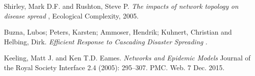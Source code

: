 \documentclass[11pt]{article}
\begin{document}
\newpage
\begin{thebibliography}{9}
 Shirley, Mark D.F. and Rushton, Steve P. \textit{ The impacts of network topology on disease spread }, Ecological Complexity, 2005.

 Buzna, Lubos; Peters, Karsten; Ammoser, Hendrik;  Kuhnert, Christian and Helbing, Dirk.\textit{ Efficient Response to Cascading Disaster Spreading } .

Keeling, Matt J. and Ken T.D. Eames. \textit{ Networks and Epidemic Models } Journal of the Royal Society Interface 2.4 (2005): 295–307. PMC. Web. 7 Dec. 2015.

\end{thebibliography}
\end{document}
